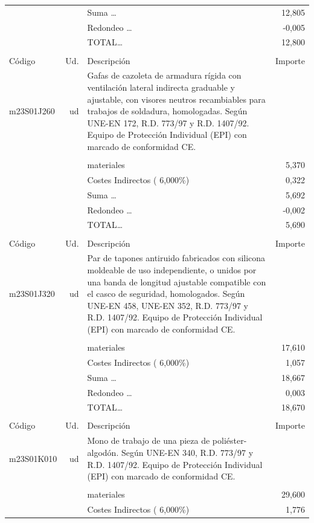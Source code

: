 \begin{supertabular}{l r p{60mm} r}
&&Suma \ldots&    12,805\\%
&&Redondeo \ldots&    {-}0,005\\%
%
&&TOTAL\ldots&    12,800\\%
&&&\\%
Código&Ud.&Descripción&Importe\\%
\hline%
m23S01J260&ud&Gafas de cazoleta de armadura rígida con ventilación lateral indirecta graduable y ajustable, con visores neutros recambiables para trabajos de soldadura, homologadas. Según UNE{-}EN 172, R.D. 773/97 y R.D. 1407/92. Equipo de Protección Individual (EPI) con marcado de conformidad CE.&\\%
&&&\\%
&&materiales&     5,370\\%
&&Costes Indirectos (     6,000\%)&     0,322\\%
&&Suma \ldots&     5,692\\%
&&Redondeo \ldots&    {-}0,002\\%
%
&&TOTAL\ldots&     5,690\\%
&&&\\%
Código&Ud.&Descripción&Importe\\%
\hline%
m23S01J320&ud&Par de tapones antiruido fabricados con silicona moldeable de uso independiente, o unidos por una banda de longitud ajustable compatible con el casco de seguridad, homologados. Según UNE{-}EN 458, UNE{-}EN 352, R.D. 773/97 y R.D. 1407/92. Equipo de Protección Individual (EPI) con marcado de conformidad CE.&\\%
&&&\\%
&&materiales&    17,610\\%
&&Costes Indirectos (     6,000\%)&     1,057\\%
&&Suma \ldots&    18,667\\%
&&Redondeo \ldots&     0,003\\%
%
&&TOTAL\ldots&    18,670\\%
&&&\\%
Código&Ud.&Descripción&Importe\\%
\hline%
m23S01K010&ud&Mono de trabajo de una pieza de poliéster{-}algodón. Según UNE{-}EN 340, R.D. 773/97 y R.D. 1407/92. Equipo de Protección Individual (EPI) con marcado de conformidad CE.&\\%
&&&\\%
&&materiales&    29,600\\%
&&Costes Indirectos (     6,000\%)&     1,776\\%

\end{supertabular}
